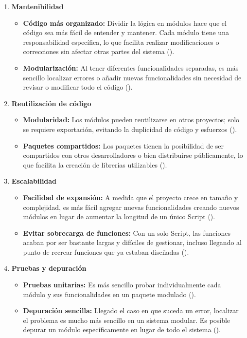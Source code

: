 \documentclass[letter,oneside,12pt,spanish]{report}
\begin{document}
\begin{enumerate}
    \item \textbf{Mantenibilidad}
    \begin{itemize}
        \item \textbf{Código más organizado:} Dividir la lógica en módulos hace que el código sea más fácil de entender y mantener. Cada módulo tiene una responsabilidad específica, lo que facilita realizar modificaciones o correcciones sin afectar otras partes del sistema (\cite{Lutz2013}).
        
        \item \textbf{Modularización:} Al tener diferentes funcionalidades separadas, es más sencillo localizar errores o añadir nuevas funcionalidades sin necesidad de revisar o modificar todo el código (\cite{Beazley2013}).
    \end{itemize}

    \item \textbf{Reutilización de código}
    \begin{itemize}
        \item \textbf{Modularidad:} Los módulos pueden reutilizarse en otros proyectos; solo se requiere exportación, evitando la duplicidad de código y esfuerzos (\cite{Pilgrim2004}).
    
        \item \textbf{Paquetes compartidos:} Los paquetes tienen la posibilidad de ser compartidos con otros desarrolladores o bien distribuirse públicamente, lo que facilita la creación de librerías utilizables (\cite{VanRossum2001}).
    \end{itemize}

    \item \textbf{Escalabilidad}
    \begin{itemize}
        \item \textbf{Facilidad de expansión:} A medida que el proyecto crece en tamaño y complejidad, es más fácil agregar nuevas funcionalidades creando nuevos módulos en lugar de aumentar la longitud de un único Script (\cite{Beazley2013}).
    
        \item \textbf{Evitar sobrecarga de funciones:} Con un solo Script, las funciones acaban por ser bastante largas y difíciles de gestionar, incluso llegando al punto de recrear funciones que ya estaban diseñadas (\cite{Lutz2013}).
    \end{itemize}

    \item \textbf{Pruebas y depuración}
    \begin{itemize}
        \item \textbf{Pruebas unitarias:} Es más sencillo probar individualmente cada módulo y sus funcionalidades en un paquete modulado (\cite{Pilgrim2004}).
    
        \item \textbf{Depuración sencilla:} Llegado el caso en que suceda un error, localizar el problema es mucho más sencillo en un sistema modular. Es posible depurar un módulo específicamente en lugar de todo el sistema (\cite{Lutz2013}).
    \end{itemize}
\end{enumerate}
\end{document}
